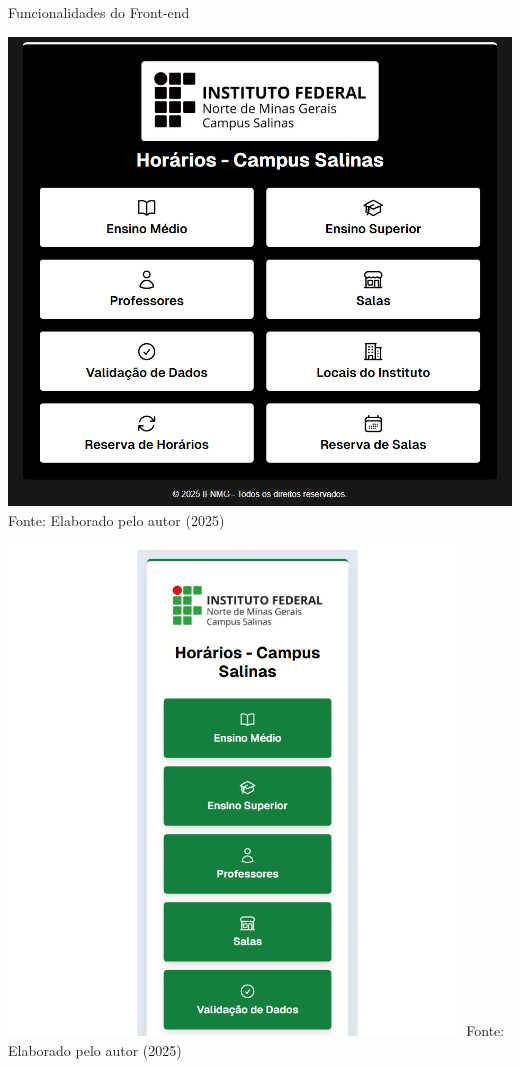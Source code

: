 \begin{frame}{Funcionalidades do Front-end}
    \begin{minipage}{0.48\textwidth}
        \centering
        \includegraphics[width=1\textwidth]{figuras/front-15.png}
        \small Fonte: Elaborado pelo autor (2025)
    \end{minipage}
    \hfill
    \begin{minipage}{0.48\textwidth}
        \centering
        \includegraphics[width=0.9\textwidth]{figuras/front-16.png}
        \small Fonte: Elaborado pelo autor (2025)
    \end{minipage}
\end{frame}

